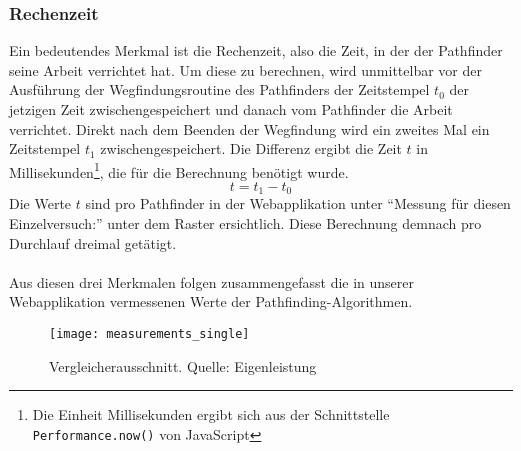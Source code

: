 \subsubsection{Rechenzeit}
Ein bedeutendes Merkmal ist die Rechenzeit, also die Zeit, in der der Pathfinder seine Arbeit verrichtet hat. 
Um diese zu berechnen, wird unmittelbar vor der Ausführung der Wegfindungsroutine des Pathfinders der Zeitstempel $t_0$ der jetzigen Zeit zwischengespeichert und danach vom Pathfinder die Arbeit verrichtet. 
Direkt nach dem Beenden der Wegfindung wird ein zweites Mal ein Zeitstempel $t_1$ zwischengespeichert. Die Differenz ergibt die Zeit $t$ in Millisekunden\footnote{Die Einheit Millisekunden ergibt sich aus der Schnittstelle \texttt{Performance.now()} von JavaScript}, die für die Berechnung benötigt wurde.
\begin{equation}
  t = t_1 - t_0
\end{equation}
Die Werte $t$ sind pro Pathfinder in der Webapplikation unter ``Messung für diesen Einzelversuch:'' unter dem Raster ersichtlich. Diese Berechnung demnach pro Durchlauf dreimal getätigt.
\\\\
Aus diesen drei Merkmalen folgen zusammengefasst die in unserer Webapplikation vermessenen Werte der Pathfinding-Algorithmen.
\begin{figure}[H]
  \centering
  \texttt{[image: measurements\_single]}
  \caption[Ausschnitt aus dem Pathfinding-Vergleicher für einzelne Vergleiche.]{Vergleicherausschnitt. Quelle: Eigenleistung}
  \label{fig:gui_konzept_comparator}
\end{figure}
